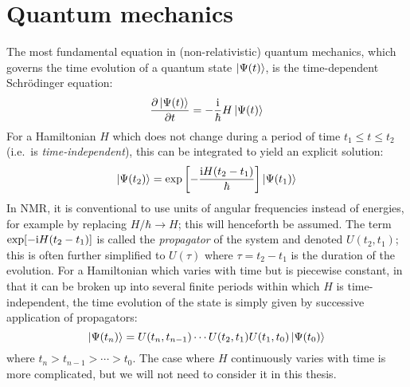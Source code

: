 \section{Quantum mechanics}
\label{sec:theory__quantum_mechanics}

The most fundamental equation in (non-relativistic) quantum mechanics, which governs the time evolution of a quantum state $\ket{\Psi(t)}$, is the time-dependent Schr\"{o}dinger equation:
\begin{equation}
    \label{eq:tdse}
    \frac{\partial\ket{\Psi(t)}}{\partial t} = -\frac{\mathrm{i}}{\hbar}H\ket{\Psi(t)} 
\end{equation}
For a Hamiltonian $H$ which does not change during a period of time $t_1 \leq t \leq t_2$ (i.e.\ is \textit{time-independent}), this can be integrated to yield an explicit solution:
\begin{equation}
    \label{eq:time_evolution}
    \ket{\Psi(t_2)} = \exp\left[-\frac{\mathrm{i} H (t_2 - t_1)}{\hbar}\right]\ket{\Psi(t_1)}
\end{equation}
In NMR, it is conventional to use units of angular frequencies instead of energies, for example by replacing $H/\hbar \to H$; this will henceforth be assumed.
The term $\exp[-\mathrm{i} H(t_2 - t_1)]$ is called the \textit{propagator} of the system and denoted $U(t_2, t_1)$; this is often further simplified to $U(\tau)$ where $\tau = t_2 - t_1$ is the duration of the evolution.
For a Hamiltonian which varies with time but is piecewise constant, in that it can be broken up into several finite periods within which $H$ is time-independent, the time evolution of the state is simply given by successive application of propagators:
\begin{equation}
    \label{eq:time_evolution_piecewise}
    \ket{\Psi(t_n)} = U(t_n,t_{n-1})\cdots U(t_2,t_1)U(t_1,t_0) \ket{\Psi(t_0)}
\end{equation}
where $t_n > t_{n-1} > \cdots > t_0$.
The case where $H$ continuously varies with time is more complicated, but we will not need to consider it in this thesis.

